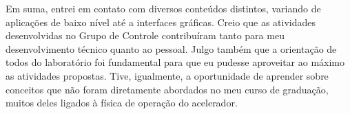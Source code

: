 \vspace{12pt}

Em suma, entrei em contato com diversos conteúdos distintos, variando
de aplicações de baixo nível até a interfaces gráficas. Creio que as atividades
desenvolvidas no Grupo de Controle  contribuíram tanto para meu desenvolvimento
técnico quanto ao pessoal. Julgo também que a orientação de
todos do laboratório foi fundamental para que eu pudesse aproveitar ao máximo as
atividades propostas. Tive, igualmente, a oportunidade de aprender
sobre conceitos que não foram diretamente abordados no meu curso de graduação,
muitos deles ligados à física de operação do acelerador.
 
